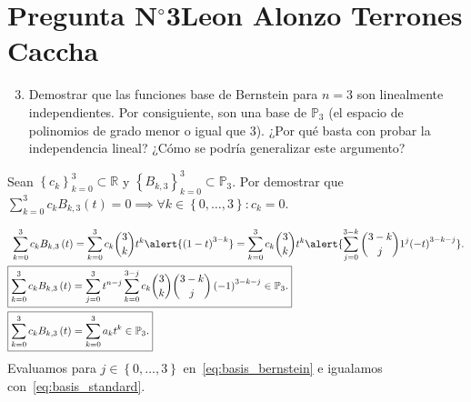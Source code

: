 \section{Pregunta N$^{\circ}$3\qquad Leon Alonzo Terrones Caccha}

\begin{frame}
    \begin{enumerate}\setcounter{enumi}{2}
        \item
              Demostrar que las funciones base de Bernstein para
              $n=3$ son linealmente independientes.
              Por consiguiente, son una base de $\mathbb{P}_{3}$
              (\alert{el espacio de polinomios de grado menor o igual
                  que $3$}).
              ¿Por qué basta con probar la independencia lineal?
              ¿Cómo se podría generalizar este argumento?
    \end{enumerate}

    \begin{solution}
        Sean
        \begin{math}
            {\left\{c_{k}\right\}}^{3}_{k=0}\subset\mathbb{R}
        \end{math}
        y
        \begin{math}
            {\left\{B_{k,3}\right\}}^{3}_{k=0}\subset\mathbb{P}_{3}
        \end{math}.
        Por demostrar que
        \begin{math}
            \sum\limits_{k=0}^{3}
            c_{k}
            B_{k,3}\left(t\right)=
            0\implies
            \forall k\in\left\{0,\dotsc,3\right\}:
            c_{k}=0
        \end{math}.

        \begin{align}
            \sum_{k=0}^{3}
            c_{k}
            B_{k,3}\left(t\right)
             & =
            \sum_{k=0}^{3}
            c_{k}
            \binom{3}{k}
            t^{k}
            \alert{
                {\left(1-t\right)}^{3-k}
            }=
            \sum_{k=0}^{3}
            c_{k}\binom{3}{k}t^k
            \alert{
                \sum_{j=0}^{3-k}
                \binom{3-k}{j}
                1^{j}
                    {\left(-t\right)}^{3-k-j}
            }.\notag \\
            \label{eq:basis_bernstein}
            \Aboxed{
                \sum_{k=0}^{3}
                c_{k}
                B_{k,3}\left(t\right)
             & =
                \sum_{j=0}^{3}
                t^{n-j}
                \sum_{k=0}^{3-j}
                c_{k}
                \binom{3}{k}
                \binom{3-k}{j}
                \left(-1\right)^{3-k-j}\in\mathbb{P}_{3}.
            }        \\
            \label{eq:basis_standard}
            \Aboxed{
                \sum_{k=0}^{3}
                c_{k}
                B_{k,3}\left(t\right)
             & =
                \sum_{k=0}^{3}
                a_{k}
                t^{k}\in\mathbb{P}_{3}.
            }
        \end{align}
        Evaluamos para $j\in\left\{0,\dotsc,3\right\}$
        en~\eqref{eq:basis_bernstein} e igualamos
        con~\eqref{eq:basis_standard}.


\end{solution}
\end{frame}

